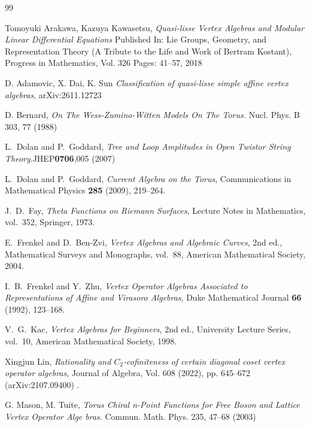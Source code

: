 \documentclass[11pt,a4paper]{amsart}
\numberwithin{equation}{section}
\theoremstyle{definition}
\theoremstyle{remark}
\begin{document}
\begin{thebibliography}{99}





 Tomoyuki Arakawa, Kazuya Kawasetsu, 
\emph{Quasi-lisse Vertex Algebras and Modular Linear Differential Equations}
Published In: Lie Groups, Geometry, and Representation Theory (A Tribute to the Life and Work of Bertram Kostant), Progress in Mathematics, Vol. 326 
Pages: 41--57, 2018 


 D. Adamovic, X. Dai, K. Sun
 \emph{Classification of quasi-lisse simple affine vertex algebras}, arXiv:2611.12723 




  D. Bernard, \emph{On The Wess-Zumino-Witten Models On The Torus.}   Nucl. Phys. B 303, 77 (1988)



 L.~Dolan and P.~Goddard, \emph{Tree and Loop Amplitudes in Open Twistor String Theory}.JHEP{\bf 0706},005 (2007)


L.~Dolan and P.~Goddard,
\emph{Current Algebra on the Torus},
Communications in Mathematical Physics \textbf{285} (2009), 219--264.

J.~D.~Fay,
\emph{Theta Functions on Riemann Surfaces},
Lecture Notes in Mathematics, vol.~352, Springer, 1973.



E.~Frenkel and D.~Ben-Zvi,
\emph{Vertex Algebras and Algebraic Curves}, 2nd ed.,
Mathematical Surveys and Monographs, vol.~88,
American Mathematical Society, 2004.




I.~B.~Frenkel and Y.~Zhu,
\emph{Vertex Operator Algebras Associated to Representations of Affine
and Virasoro Algebras},
Duke Mathematical Journal \textbf{66} (1992), 123--168.



V.~G.~Kac,
\emph{Vertex Algebras for Beginners}, 2nd ed.,
University Lecture Series, vol.~10, American Mathematical Society, 1998.


  Xingjun Lin, \emph{Rationality and $C_2$-cofiniteness of certain diagonal coset vertex operator algebras}, Journal of Algebra, Vol. 608 (2022), pp. 645--672 (arXiv:2107.09400) .

 G. Mason, M. Tuite, \emph{ Torus Chiral n-Point Functions for Free Boson and Lattice Vertex Operator Alge
 bras}. Commun. Math. Phys. 235, 47–68 (2003)


\end{thebibliography}
\end{document}
